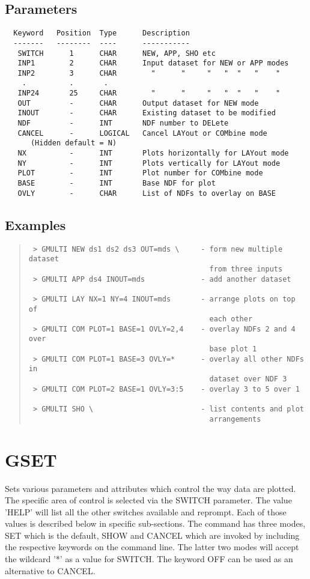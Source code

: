 \documentclass{book}
\renewcommand{\_}{{\tt\char'137}}     %
\begin{document}
\subsection{Parameters}
\begin{verbatim}
  Keyword   Position  Type      Description
  -------   --------  ----      -----------
   SWITCH      1      CHAR      NEW, APP, SHO etc
   INP1        2      CHAR      Input dataset for NEW or APP modes
   INP2        3      CHAR        "      "     "   "  "   "    "
    .          .       .
   INP24       25     CHAR        "      "     "   "  "   "    "
   OUT         -      CHAR      Output dataset for NEW mode
   INOUT       -      CHAR      Existing dataset to be modified
   NDF         -      INT       NDF number to DELete
   CANCEL      -      LOGICAL   Cancel LAYout or COMbine mode
      (Hidden default = N)
   NX          -      INT       Plots horizontally for LAYout mode
   NY          -      INT       Plots vertically for LAYout mode
   PLOT        -      INT       Plot number for COMbine mode
   BASE        -      INT       Base NDF for plot
   OVLY        -      CHAR      List of NDFs to overlay on BASE
\end{verbatim}\subsection{Examples}
\begin{quote}\begin{verbatim}
 > GMULTI NEW ds1 ds2 ds3 OUT=mds \     - form new multiple dataset
                                          from three inputs
 > GMULTI APP ds4 INOUT=mds             - add another dataset

 > GMULTI LAY NX=1 NY=4 INOUT=mds       - arrange plots on top of
                                          each other
 > GMULTI COM PLOT=1 BASE=1 OVLY=2,4    - overlay NDFs 2 and 4 over
                                          base plot 1
 > GMULTI COM PLOT=1 BASE=3 OVLY=*      - overlay all other NDFs in
                                          dataset over NDF 3
 > GMULTI COM PLOT=2 BASE=1 OVLY=3:5    - overlay 3 to 5 over 1

 > GMULTI SHO \                         - list contents and plot
                                          arrangements
\end{verbatim}\end{quote}
\section{GSET}
Sets various parameters and attributes which control the way data
are plotted. The specific area of control is selected via the
SWITCH parameter. The value 'HELP' will list all the other switches
available and reprompt. Each of those values is described below
in specific sub-sections. The command has three modes, SET which
is the default, SHOW and CANCEL which are invoked by including the
respective keywords on the command line. The latter two modes will
accept the wildcard '*' as a value for SWITCH. The keyword OFF can be
used as an alternative to CANCEL.
\end{document}
